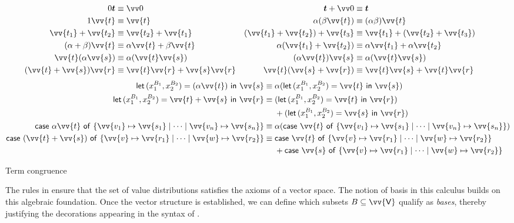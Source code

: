 \documentclass[runningheads,orivec,envcountsame,envcountsect]{llncs}
\DeclareRobustCommand{\ValD}{\ensuremath{\vv{\mathsf{V}}}}
\def\Pair#1#2{(#1,#2)} %
\def\letkeyword{\mathsf{let}}
\def\inkeyword{\mathsf{in}}
\def\LetP#1#2#3#4#5#6{\letkeyword\,\Pair{#1^{#2}}{#3^{#4}}=#5~\inkeyword~#6}
\def\gencase#1#2#3#4#5{\ensuremath{\mathsf{case}~#1~\mathsf{of}~\{#2\mapsto #4 \mid \dotsb \mid #3\mapsto #5\}}}
\begin{document}
\begin{table}[t]
  \begin{align*}
    0\vec t &\equiv \vv 0 & \vec t+\vv 0 &\equiv \vec t \\
    1\vv{t} &\equiv \vv{t} &
    \alpha(\beta\vv{t}) &\equiv (\alpha\beta)\vv{t} \\
    \vv{t_1}+\vv{t_2} &\equiv \vv{t_2}+\vv{t_1} &
    (\vv{t_1}+\vv{t_2})+\vv{t_3} &\equiv \vv{t_1}+(\vv{t_2}+\vv{t_3}) \\
    (\alpha+\beta)\vv{t} &\equiv \alpha\vv{t}+\beta\vv{t} &
    \alpha(\vv{t_1}+\vv{t_2}) &\equiv \alpha\vv{t_1}+\alpha\vv{t_2} \\
    \vv{t}(\alpha\vv{s}) &\equiv \alpha(\vv{t}\vv{s}) &
    (\alpha\vv{t})\vv{s} &\equiv \alpha(\vv{t}\vv{s}) \\
    (\vv{t}+\vv{s})\vv{r} &\equiv \vv{t}\vv{r}+\vv{s}\vv{r} &
    \vv{t}(\vv{s}+\vv{r}) &\equiv \vv{t}\vv{s}+\vv{t}\vv{r} &&
  \end{align*}
  \begin{align*}
    \LetP{x_1}{B_1}{x_2}{B_2}{(\alpha\vv{t})}{\vv{s}}
    &\equiv \alpha(\LetP{x_1}{B_1}{x_2}{B_2}{\vv{t}}{\vv{s}}) \\
    \LetP{x_1}{B_1}{x_2}{B_2}{\vv{t}+\vv{s}}{\vv{r}}
    &
    \equiv
    \begin{aligned}[t]
      &(\LetP{x_1}{B_1}{x_2}{B_2}{\vv{t}}{\vv{r}})\\
      &+(\LetP{x_1}{B_1}{x_2}{B_2}{\vv{s}}{\vv{r}}) 
    \end{aligned}\\
    \gencase{\alpha \vv{t}}{\vv{v_1}}{\vv{v_n}}{\vv{s_1}}{\vv{s_n}}
    &\equiv \alpha(\gencase{\vv{t}}{\vv{v_1}}{\vv{v_n}}{\vv{s_1}}{\vv{s_n}}) \\
    \gencase{(\vv{t}+\vv{s})}{\vv{v}}{\vv{w}}{\vv{r_1}}{\vv{r_2}}
    &\equiv\begin{aligned}[t]
      &\gencase{\vv{t}}{\vv{v}}{\vv{w}}{\vv{r_1}}{\vv{r_2}}\\
      &+\gencase{\vv{s}}{\vv{v}}{\vv{w}}{\vv{r_1}}{\vv{r_2}}
    \end{aligned}
  \end{align*}
  \caption{Term congruence}
  \label{tab:Congruence}
\end{table}

The rules in  ensure that the
set of value distributions satisfies the axioms of a vector space.  The notion
of basis in this calculus builds on this algebraic foundation. Once the vector
structure is established, we can define which subsets $B\subseteq \ValD$
qualify as \emph{bases}, thereby justifying the decorations appearing in the
syntax of .
\end{document}
